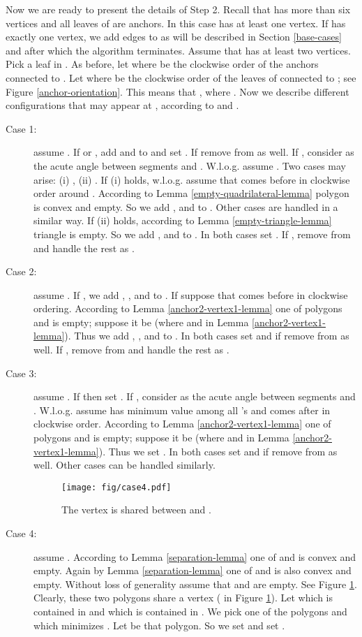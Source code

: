 \documentclass[11pt,a4paper]{article}
\begin{document}
Now we are ready to present the details of Step 2. Recall that  has more than six vertices and all leaves of  are anchors. In this case  has at least one vertex. If  has exactly one vertex, we add edges to  as will be described in Section \ref{base-cases} and after which the algorithm terminates. Assume that  has at least two vertices. Pick a leaf  in . As before, let  where  be the clockwise order of the anchors connected to . Let  where  be the clockwise order of the leaves of  connected to ; see Figure \ref{anchor-orientation}. This means that , where . Now we describe different configurations that may appear at , according to  and .
 \begin{description}
  \item[Case 1:] assume . If  or , add  and  to  and set . If  remove  from  as well. If , consider  as the acute angle between segments  and . W.l.o.g. assume . Two cases may arise: (i) , (ii) . If (i) holds, w.l.o.g. assume that  comes before  in clockwise order around . According to Lemma \ref{empty-quadrilateral-lemma} polygon  is convex and empty. So we add ,  and  to . Other cases are handled in a similar way. If (ii) holds, according to Lemma \ref{empty-triangle-lemma} triangle  is empty. So we add ,  and  to . In both cases set . If , remove  from  and handle the rest as .
  \item[Case 2:] assume . If , we add , , and  to . If  suppose that  comes before  in clockwise ordering. According to Lemma \ref{anchor2-vertex1-lemma} one of polygons  and  is empty; suppose it be  (where  and  in Lemma \ref{anchor2-vertex1-lemma}). Thus we add , ,  and  to . In both cases set  and if  remove  from  as well. If , remove  from  and handle the rest as .
  \item[Case 3:] assume . If  then set . If , consider  as the acute angle between segments  and . W.l.o.g. assume  has minimum value among all 's and  comes after  in clockwise order. According to Lemma \ref{anchor2-vertex1-lemma} one of polygons  and  is empty; suppose it be  (where  and  in Lemma \ref{anchor2-vertex1-lemma}). Thus we set . In both cases set  and if  remove  from  as well. Other cases can be handled similarly.


\begin{figure}[ht]
  \centering
    \texttt{[image: fig/case4.pdf]}
  \caption{The vertex  is shared between  and .}
\label{case4-fig}
\end{figure}

  \item[Case 4:] assume . According to Lemma \ref{separation-lemma} one of  and  is convex and empty. Again by Lemma \ref{separation-lemma} one of  and  is also convex and empty. Without loss of generality assume that  and  are empty. See Figure \ref{case4-fig}. Clearly, these two polygons share a vertex ( in Figure \ref{case4-fig}). Let  which is contained in  and  which is contained in . We pick one of the polygons  and  which minimizes . Let  be that polygon. So we set  and set . 
 \end{description}
\end{document}
